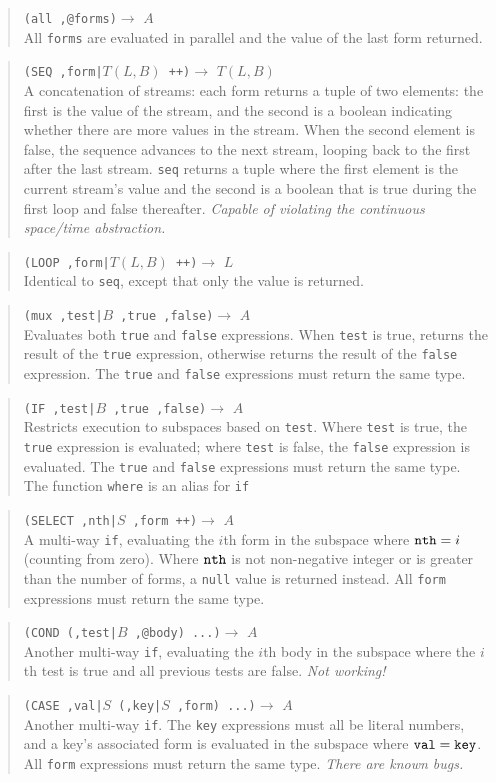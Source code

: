 \documentclass{article}
\newcommand\broken{{\em Not working!}}
\newcommand\bugs{{\em There are known bugs.}}
\newcommand\violation{{\em Capable of violating the continuous
    space/time abstraction.}}
\newcommand\function[3]
{\begin{quote}{\tt #1}$\rightarrow$ \type{#2} \\ #3 \end{quote}}
\newcommand\type[1]{$#1$}
\newcommand\var[1]{{\tt #1}}
\begin{document}
\function{(all ,@forms)}{A}{All \var{forms} are evaluated in parallel
  and the value of the last form returned.}

\function{(SEQ ,form|\type{T(L,B)} ++)}{T(L,B)}{A concatenation of
  streams: each form returns a tuple of two elements: the first is the
  value of the stream, and the second is a boolean indicating whether
  there are more values in the stream.  When the second element is
  false, the sequence advances to the next stream, looping back to the
  first after the last stream.  \var{seq} returns a tuple where the
  first element is the current stream's value and the second is a
  boolean that is true during the first loop and false thereafter.
  \violation{}}

\function{(LOOP ,form|\type{T(L,B)} ++)}{L}{Identical to \var{seq},
  except that only the value is returned.}

\function{(mux ,test|\type{B} ,true ,false)}{A}{Evaluates both
  \var{true} and \var{false} expressions.  When \var{test} is true,
  returns the result of the \var{true} expression, otherwise returns
  the result of the \var{false} expression.  The \var{true} and
  \var{false} expressions must return the same type.}

\function{(IF ,test|\type{B} ,true ,false)}{A}{Restricts execution to
  subspaces based on \var{test}.  Where \var{test} is true, the
  \var{true} expression is evaluated; where \var{test} is false, the
  \var{false} expression is evaluated.  The \var{true} and \var{false}
  expressions must return the same type. The function \var{where} is
  an alias for \var{if}}

\function{(SELECT ,nth|\type{S} ,form ++)}{A}{A multi-way
  \var{if}, evaluating the $i$th form in the subspace where
  $\var{nth}=i$ (counting from zero).  Where $\var{nth}$ is not
  non-negative integer or is greater than the number of forms, a
  \var{null} value is returned instead.  All \var{form} expressions
  must return the same type.}

\function{(COND (,test|\type{B} ,@body) ...)}{A}{Another multi-way
  \var{if}, evaluating the $i$th body in the subspace where the
  $i$th test is true and all previous tests are false.  \broken{}}

\function{(CASE ,val|\type{S} (,key|\type{S} ,form) ...)}{A}{Another
  multi-way \var{if}.  The \var{key} expressions must all be literal
  numbers, and a key's associated form is evaluated in the subspace
  where $\var{val}=\var{key}$.  All \var{form} expressions must return
  the same type.  \bugs{}}
\end{document}
